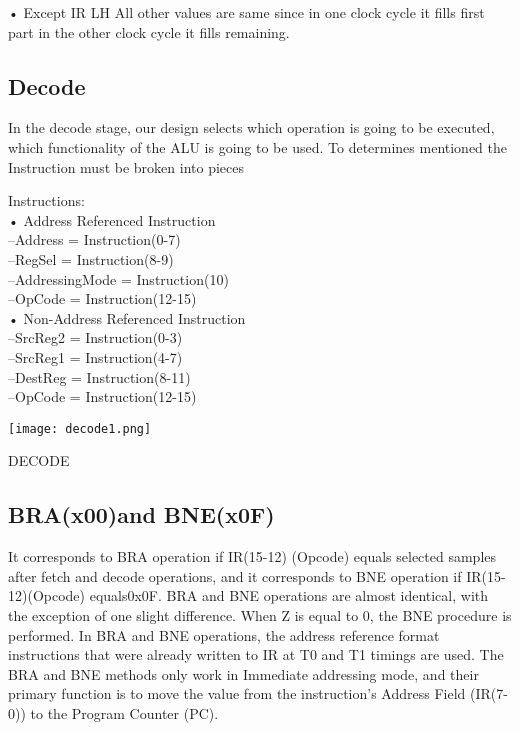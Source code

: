 \documentclass[pdftex,12pt,a4paper]{article}
\begin{document}
• Except IR LH All other values are same  since in one clock cycle it fills first part in the other clock cycle it fills remaining.

\subsection{Decode}
In the decode stage, our design selects which operation is going to be executed, which functionality of the ALU is going to be used. To determines mentioned the Instruction must be broken into pieces


Instructions:\\

• Address Referenced Instruction\\

–Address = Instruction(0-7)\\

–RegSel = Instruction(8-9)\\

–AddressingMode = Instruction(10)\\

–OpCode = Instruction(12-15)\\

• Non-Address Referenced Instruction\\

–SrcReg2 = Instruction(0-3)\\

–SrcReg1 = Instruction(4-7)\\

–DestReg = Instruction(8-11)\\

–OpCode = Instruction(12-15)\\


\begin{figure2}
	\centering
	\texttt{[image: decode1.png]}	
	\caption{DECODE}
	\label{fig1}
\end{figure2}

\subsection{BRA(x00)and BNE(x0F)}
It corresponds to BRA operation if IR(15-12) (Opcode) equals selected samples after fetch and decode operations, and it corresponds to BNE operation if IR(15-12)(Opcode) equals0x0F. BRA and BNE operations are almost identical, with the exception of one slight difference. When Z is equal to 0, the BNE procedure is performed. In BRA and BNE operations, the address reference format instructions that were already written to IR at T0 and T1 timings are used. The BRA and BNE methods only work in Immediate addressing mode, and their primary function is to move the value from the instruction's Address Field (IR(7-0)) to the Program Counter (PC).
\end{document}
